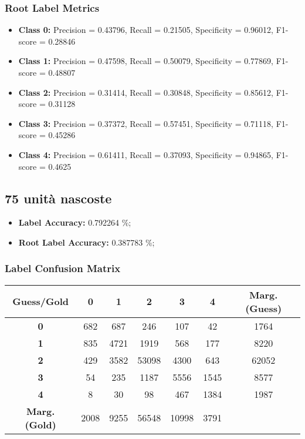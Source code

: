 \subsubsection{Root Label Metrics}
\begin{itemize}
	\item \textbf{Class 0:} Precision = 0.43796, Recall = 0.21505, Specificity = 0.96012, F1-score = 0.28846
	\item \textbf{Class 1:} Precision = 0.47598, Recall = 0.50079, Specificity = 0.77869, F1-score = 0.48807
	\item \textbf{Class 2:} Precision = 0.31414, Recall = 0.30848, Specificity = 0.85612, F1-score = 0.31128
	\item \textbf{Class 3:} Precision = 0.37372, Recall = 0.57451, Specificity = 0.71118, F1-score = 0.45286
	\item \textbf{Class 4:} Precision = 0.61411, Recall = 0.37093, Specificity = 0.94865, F1-score = 0.4625
\end{itemize}

\subsection{75 unità nascoste}

\begin{itemize}
	\item \textbf{Label Accuracy:} 0.792264 \%;
	\item \textbf{Root Label Accuracy:} 0.387783 \%;
\end{itemize}

\subsubsection{Label Confusion Matrix}
\begin{table}[h]
	\centering
	\begin{tabular}{c|ccccc|c}
		\textbf{Guess/Gold}   & \textbf{0} & \textbf{1} & \textbf{2} & \textbf{3} & \textbf{4} & \textbf{Marg. (Guess)} \\
		\hline
		\textbf{0}            & 682        & 687        & 246        & 107        & 42         & 1764                   \\
		\textbf{1}            & 835        & 4721       & 1919       & 568        & 177        & 8220                   \\
		\textbf{2}            & 429        & 3582       & 53098      & 4300       & 643        & 62052                  \\
		\textbf{3}            & 54         & 235        & 1187       & 5556       & 1545       & 8577                   \\
		\textbf{4}            & 8          & 30         & 98         & 467        & 1384       & 1987                   \\
		\hline
		\textbf{Marg. (Gold)} & 2008       & 9255       & 56548      & 10998      & 3791       &                        \\
	\end{tabular}
\end{table}

